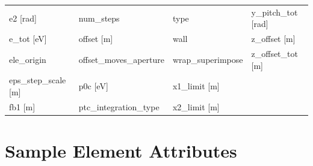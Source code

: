 \begin{tabular}{llll}
e2 [rad]                         & num_steps                        & type                             & y_pitch_tot [rad]                \\
e_tot [eV]                       & offset [m]                       & wall                             & z_offset [m]                     \\
ele_origin                       & offset_moves_aperture            & wrap_superimpose                 & z_offset_tot [m]                 \\
eps_step_scale [m]               & p0c [eV]                         & x1_limit [m]                     &                                  \\
fb1 [m]                          & ptc_integration_type             & x2_limit [m]                     &                                  \\
 \bottomrule
 \end{tabular}
 \vfill
 
 \section{Sample Element Attributes}
 \label{s:list.sample}
 
